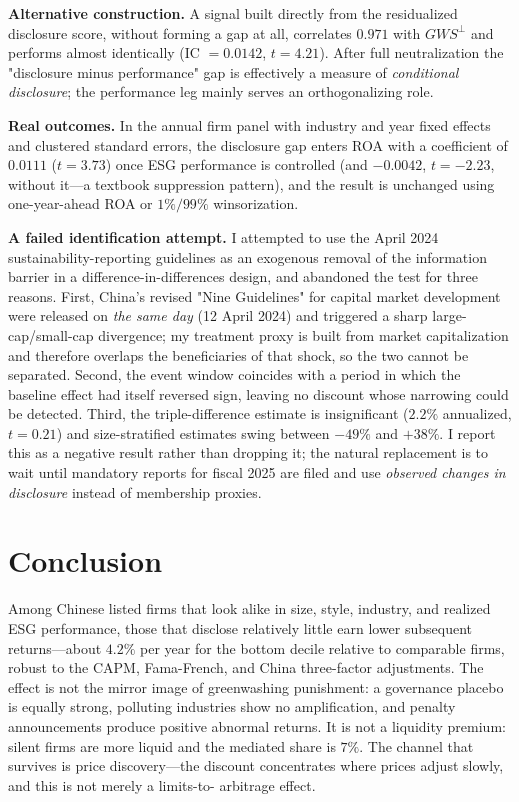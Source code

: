 \documentclass[12pt]{article}
\newcommand{\gwsp}{\ensuremath{\textit{GWS}^{\perp}}}
\begin{document}
\noindent\textbf{Alternative construction.} A signal built directly from the
residualized disclosure score, without forming a gap at all, correlates $0.971$
with \gwsp{} and performs almost identically (IC $=0.0142$, $t=4.21$). After
full neutralization the "disclosure minus performance" gap is effectively a
measure of \emph{conditional disclosure}; the performance leg mainly serves an
orthogonalizing role.

\noindent\textbf{Real outcomes.} In the annual firm panel with industry and
year fixed effects and clustered standard errors, the disclosure gap enters ROA
with a coefficient of $0.0111$ ($t=3.73$) once ESG performance is controlled
(and $-0.0042$, $t=-2.23$, without it---a textbook suppression pattern), and
the result is unchanged using one-year-ahead ROA or $1\%/99\%$ winsorization.

\noindent\textbf{A failed identification attempt.} I attempted to use the April
2024 sustainability-reporting guidelines as an exogenous removal of the
information barrier in a difference-in-differences design, and abandoned the
test for three reasons. First, China's revised "Nine Guidelines" for capital
market development were released on \emph{the same day} (12 April 2024) and
triggered a sharp large-cap/small-cap divergence; my treatment proxy is built
from market capitalization and therefore overlaps the beneficiaries of that
shock, so the two cannot be separated. Second, the event window coincides with
a period in which the baseline effect had itself reversed sign, leaving no
discount whose narrowing could be detected. Third, the triple-difference
estimate is insignificant ($2.2\%$ annualized, $t=0.21$) and size-stratified
estimates swing between $-49\%$ and $+38\%$. I report this as a negative result
rather than dropping it; the natural replacement is to wait until mandatory
reports for fiscal 2025 are filed and use \emph{observed changes in disclosure}
instead of membership proxies.

\section{Conclusion}

Among Chinese listed firms that look alike in size, style, industry, and
realized ESG performance, those that disclose relatively little earn lower
subsequent returns---about $4.2\%$ per year for the bottom decile relative to
comparable firms, robust to the CAPM, Fama-French, and China three-factor
adjustments. The effect is not the mirror image of greenwashing punishment: a
governance placebo is equally strong, polluting industries show no
amplification, and penalty announcements produce positive abnormal returns. It
is not a liquidity premium: silent firms are more liquid and the mediated share
is $7\%$. The channel that survives is price discovery---the discount
concentrates where prices adjust slowly, and this is not merely a limits-to-
arbitrage effect.
\end{document}
